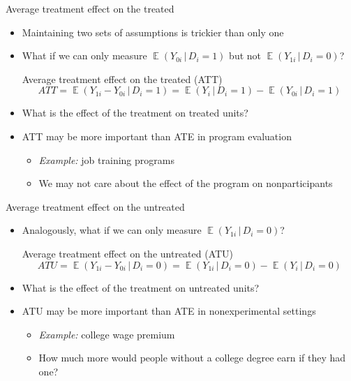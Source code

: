 \documentclass[aspectratio=169,compress,handout,t,xcolor=table]{beamer}
\DeclareMathOperator{\E}{\mathbb{E}}                       %
\begin{document}
\begin{frame}{Average treatment effect on the treated}
  \begin{itemize}
    \item Maintaining two sets of assumptions is trickier than only one
    \item What if we can only measure \(\E(Y_{0i} \, | \, D_i = 1)\) but not \(\E(Y_{1i} \, | \, D_i = 0)\)?
    \begin{block}{Average treatment effect on the treated (ATT)}
      \begin{equation*}
        ATT = \E(Y_{1i} - Y_{0i} \,|\, D_i=1) = \E(Y_{i} \,|\, D_i=1) - \E(Y_{0i} \,|\, D_i=1)
      \end{equation*}
    \end{block}
    \item What is the effect of the treatment on treated units?
    \item ATT may be more important than ATE in program evaluation
    \begin{itemize}
      \item \emph{Example:} job training programs
      \item We may not care about the effect of the program on nonparticipants
    \end{itemize}
  \end{itemize}
\end{frame}

\begin{frame}{Average treatment effect on the untreated}
  \begin{itemize}
    \item Analogously, what if we can only measure \(\E(Y_{1i} \, | \, D_i = 0)\)?
    \begin{block}{Average treatment effect on the untreated (ATU)}
      \begin{equation*}
        ATU = \E(Y_{1i} - Y_{0i} \,|\, D_i=0) = \E(Y_{1i} \,|\, D_i=0) - \E(Y_{i} \,|\, D_i=0)
      \end{equation*}
    \end{block}
    \item What is the effect of the treatment on untreated units?
    \item ATU may be more important than ATE in nonexperimental settings
    \begin{itemize}
      \item \emph{Example:} college wage premium
      \item How much more would people without a college degree earn if they had one?
    \end{itemize}
  \end{itemize}
\end{frame}
\end{document}
